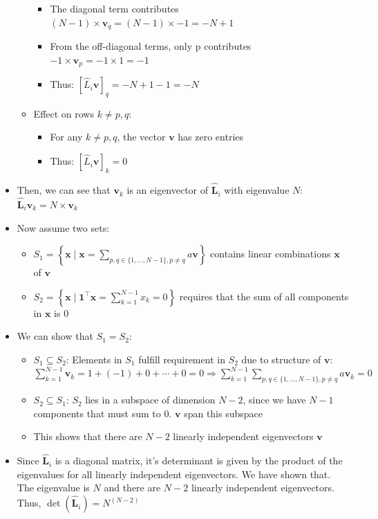 \begin{itemize}
\begin{itemize}
\begin{itemize}
            \item The diagonal term contributes $(N-1) \times \boldsymbol{v}_q = (N-1) \times -1 = -N+1$
            \item From the off-diagonal terms, only p contributes $-1 \times \boldsymbol{v}_p = -1 \times 1 = -1$
            \item Thus:
            $
            [\hat{L}_i \boldsymbol{v}]_q = - N + 1 - 1 = -N
            $
        \end{itemize}
        \item Effect on rows $k \neq p, q$:
        \begin{itemize}
            \item For any $k \neq p, q$, the vector $\boldsymbol{v}$ has zero entries
            \item Thus:
            $
            [\hat{L}_i \boldsymbol{v}]_k = 0
            $
        \end{itemize}
    \end{itemize}
    \item Then, we can see that $\boldsymbol{v}_k$ is an eigenvector of $\hat{\boldsymbol{L}}_i$ with eigenvalue $N$:
    $\hat{\boldsymbol{L}}_i \boldsymbol{v}_k = N \times \boldsymbol{v}_k$
    \item Now assume two sets:
    \begin{itemize}
        \item $
        S_1 = \left\{ \boldsymbol{x} \mid \boldsymbol{x} = \sum_{p,q \in \{1, \ldots, N-1\}, p \neq q} a \boldsymbol{v} \right\}
        $ contains linear combinations $\boldsymbol{x}$ of $\boldsymbol{v}$
        \item $
        S_2 = \left\{ \boldsymbol{x} \mid \boldsymbol{1}^\intercal \boldsymbol{x} = \sum_{k=1}^{N-1} x_k = 0 \right\}
        $ requires that the sum of all components in $\boldsymbol{x}$ is 0
    \end{itemize}
    \item We can show that $S_1 = S_2$:
    \begin{itemize}
        \item $ S_1 \subseteq S_2 $: Elements in $S_1$ fulfill requirement in $S_2$ due to structure of $\boldsymbol{v}$: $\sum_{k=1}^{N-1} \boldsymbol{v}_k = 1 + (-1) + 0 + \cdots + 0 = 0 \Rightarrow \sum_{k=1}^{N-1} \sum_{p,q \in \{1, \ldots, N-1\}, p \neq q} a \boldsymbol{v}_k = 0$
        \item $ S_2 \subseteq S_1 $: $S_2$ lies in a subspace of dimension $N-2$, since we have $N-1$ components that must sum to $0$.  $\boldsymbol{v}$ span this subspace
        \item This shows that there are $N-2$ linearly independent eigenvectors $\boldsymbol{v}$ 
    \end{itemize}
    \item Since $\hat{\boldsymbol{L}}_i$ is a diagonal matrix, it's determinant is given by the product of the eigenvalues for all linearly independent eigenvectors. We have shown that. The eigenvalue is $N$ and there are $N-2$ linearly independent eigenvectors. Thus, $\det(\hat{\boldsymbol{L}}_i) = N^{(N-2)}$
\end{itemize}
